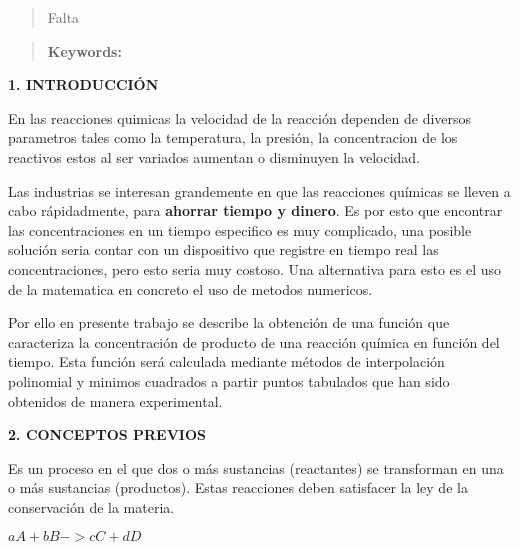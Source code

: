 \documentclass[10pt,a4paper]{article}
\begin{document}
\begin{abstract}
	\noindent Falta
\end{abstract}


\begin{quotation}
	{\small
	\textbf{Keywords:} \\ 
	}
\end{quotation}


\pagebreak

\begin{multicols}{2}

\begin{center}
	{\large \bf 1. INTRODUCCIÓN}
\end{center}

En las reacciones quimicas la velocidad de la reacción dependen de diversos parametros tales como la temperatura, la presión, la concentracion de los reactivos estos al ser variados aumentan o disminuyen la velocidad.

\noindent Las industrias se interesan grandemente en que las reacciones químicas se lleven a cabo rápidadmente, para \textbf{ahorrar tiempo y dinero}. Es por esto que  encontrar las concentraciones en un tiempo especifico es muy complicado, una posible solución seria contar con un dispositivo que registre en tiempo real las concentraciones, pero esto seria muy costoso. Una alternativa para esto es
el uso de la matematica en concreto el uso de metodos numericos.

\noindent Por ello en presente trabajo se describe la obtención de una función que caracteriza la concentración de producto de una reacción química en función del tiempo. Esta función será calculada mediante métodos de interpolación polinomial y minimos cuadrados a partir puntos tabulados que han sido obtenidos de manera experimental.\\


\begin{center}
	{\large \bf 2. CONCEPTOS PREVIOS}
\end{center}


\noindent Es un proceso en el que dos o más sustancias (reactantes) se transforman en una o más sustancias (productos). Estas reacciones deben satisfacer la ley de la conservación de la materia.

\begin{center}
	$aA  +  bB  ->  cC  +  dD$
\end{center}



\end{multicols}
\end{document}

